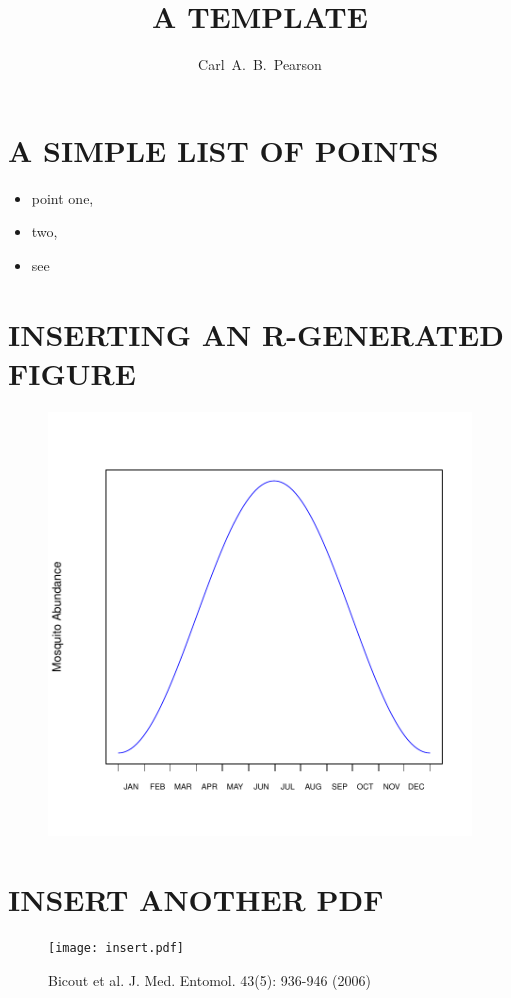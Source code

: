 \documentclass{article}
\author{Carl~A.~B.~Pearson}
\begin{document}

\title{A TEMPLATE}

\titlepage

\section{A SIMPLE LIST OF POINTS}
\begin{itemize}
\item point one,
\item two,
\item see
\end{itemize}

\section{INSERTING AN R-GENERATED FIGURE}
\begin{figure}
\begin{center}
\includegraphics{template-plotfig1}
\end{center}
\end{figure}

\section{INSERT ANOTHER PDF}
\begin{figure}
\begin{center}
\texttt{[image: insert.pdf]}
\caption{Bicout et al. J. Med. Entomol. 43(5): 936-946 (2006)}
\end{center}
\end{figure}
\end{document}
